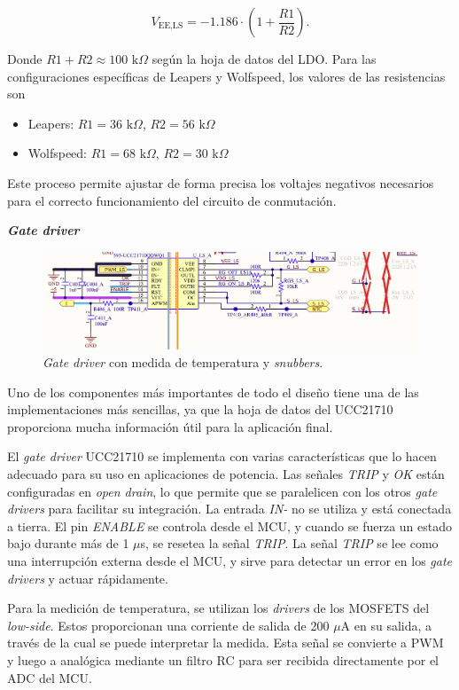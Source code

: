 \[ V_{\text{EE,LS}} = -1.186 \cdot \left(1 + \frac{R1}{R2}\right)  \text{.}\]

Donde \( R1 + R2 \approx 100 \text{ k}\Omega \) según la hoja de datos del LDO. Para las configuraciones específicas de Leapers y Wolfspeed, los valores de las resistencias son 

\begin{itemize}
	\item Leapers: \( R1 = 36 \text{ k}\Omega \), \( R2 = 56 \text{ k}\Omega \)
	\item Wolfspeed: \( R1 = 68 \text{ k}\Omega \), \( R2 = 30 \text{ k}\Omega \)
\end{itemize}

Este proceso permite ajustar de forma precisa los voltajes negativos necesarios para el correcto funcionamiento del circuito de conmutación.


\textbf{\textit{Gate driver}}
\begin{figure}[H]
	\centering
	\includegraphics[width=0.9\linewidth]{fig/GD-sch}
	\caption{\textit{Gate driver} con medida de temperatura y \textit{snubbers}.}
\end{figure}

Uno de los componentes más importantes de todo el diseño tiene una de las implementaciones más sencillas, ya que la hoja de datos del UCC21710 proporciona mucha información útil para la aplicación final.

El \textit{gate driver} UCC21710 se implementa con varias características que lo hacen adecuado para su uso en aplicaciones de potencia. Las señales \textit{TRIP} y \textit{OK} están configuradas en \textit{open drain}, lo que permite que se paralelicen con los otros \textit{gate drivers} para facilitar su integración. La entrada \textit{IN-} no se utiliza y está conectada a tierra. El pin \textit{ENABLE} se controla desde el MCU, y cuando se fuerza un estado bajo durante más de 1 $\mu$s, se resetea la señal \textit{TRIP}. La señal \textit{TRIP} se lee como una interrupción externa desde el MCU, y sirve para detectar un error en los \textit{gate drivers} y actuar rápidamente.

Para la medición de temperatura, se utilizan los \textit{drivers} de los MOSFETS del \textit{low-side}. Estos proporcionan una corriente de salida de 200 $\mu$A en su salida, a través de la cual se puede interpretar la medida. Esta señal se convierte a PWM y luego a analógica mediante un filtro RC para ser recibida directamente por el ADC del MCU. 

